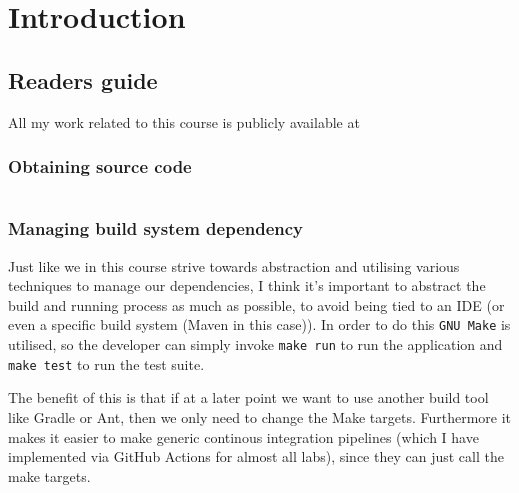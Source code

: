 \chapter{Introduction}
\section{Readers guide}
All my work related to this course is publicly available at

\subsection{Obtaining source code}
\inputminted{sh}{code/obtaining-source.sh}

\subsection{Managing build system dependency}
Just like we in this course strive towards abstraction and utilising various
techniques to manage our dependencies, I think it's important to abstract the build and
running process as much as possible, to avoid being tied to an IDE (or even a
specific build system (Maven in this case)). In order to do this \texttt{GNU
Make} is utilised, so the developer can simply invoke \texttt{make run} to run the
application and \texttt{make test} to run the test suite.

The benefit of this is that if at a later point we want to use another build tool like Gradle or Ant,
then we only need to change the Make targets. Furthermore it makes it easier to
make generic continous integration pipelines (which I have implemented via
GitHub Actions for almost all labs), since they can just call the make
targets.
